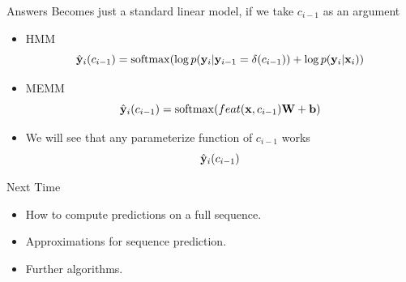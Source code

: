 \documentclass{beamer}
\begin{document}
\begin{frame}{Answers}
  Becomes just a standard linear model, if we take $c_{i-1}$ as an argument

  \begin{itemize}
  \item HMM
    \[ \hat{\boldy}_i(c_{i-1}) = \softmax(\log p(\boldy_i| \boldy_{i-1} = \delta(c_{i-1})) + \log p(\boldy_i| \boldx_i) )  \] 

    \air 
  \item MEMM
    \[ \hat{\boldy}_i(c_{i-1}) = \softmax(feat(\boldx, c_{i-1}) \boldW + \bold b)  \] 
    \air 
  \item We will see that any parameterize function of $c_{i-1}$ works \[ \hat{\mathbf{y}}_i(c_{i-1}) \] 
  \end{itemize}
\end{frame}


\begin{frame}{Next Time}
  \begin{itemize}
  \item How to compute predictions on a full sequence.
    \air
  \item Approximations for sequence prediction.
    \air 
  \item Further algorithms.
  \end{itemize}
\end{frame}




\end{document}
